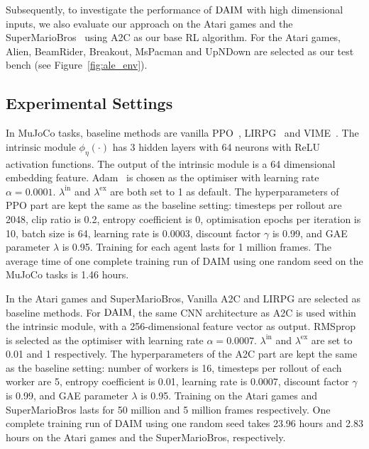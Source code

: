 Subsequently, to investigate the performance of $\text{DAIM}$ with high dimensional inputs, we also evaluate our approach on the Atari games and the SuperMarioBros~\cite{gym-super-mario-bros} using A2C as our base RL algorithm. For the Atari games, Alien, BeamRider, Breakout, MsPacman and UpNDown are selected as our test bench (see Figure~\ref{fig:ale_env}). 

\subsection{Experimental Settings}
In MuJoCo tasks, baseline methods are vanilla PPO~\cite{schulman2017proximal}, LIRPG~\cite{zheng2018learning} and VIME~\cite{NIPS2016_abd81528}. The intrinsic module $\phi_{\eta}(\cdot)$ has 3 hidden layers with 64 neurons with ReLU activation functions. The output of the intrinsic module is a 64 dimensional embedding feature. Adam~\cite{kingma2014adam} is chosen as the optimiser with learning rate $\alpha=0.0001$. $\lambda^{\text{in}}$ and $\lambda^{\text{ex}}$ are both set to 1 as default. The hyperparameters of PPO part are kept the same as the baseline setting: timesteps per rollout are 2048, clip ratio is 0.2, entropy coefficient is 0, optimisation epochs per iteration is 10, batch size is 64, learning rate is 0.0003, discount factor $\gamma$ is 0.99, and GAE parameter $\lambda$ is 0.95. Training for each agent lasts for 1 million frames. {The average time of one complete training run of DAIM using one random seed on the MuJoCo tasks is 1.46 hours.}

In the Atari games and SuperMarioBros, Vanilla A2C and LIRPG are selected as baseline methods. For $\text{DAIM}$, the same CNN architecture as A2C is used within the intrinsic module, with a 256-dimensional feature vector as output. RMSprop is selected as the optimiser with learning rate $\alpha=0.0007$. $\lambda^{\text{in}}$ and $\lambda^{\text{ex}}$ are set to 0.01 and 1 respectively. The hyperparameters of the A2C part are kept the same as the baseline setting: number of workers is 16, timesteps per rollout of each worker are 5, entropy coefficient is 0.01, learning rate is 0.0007, discount factor $\gamma$ is 0.99, and GAE parameter $\lambda$ is 0.95. Training on the Atari games and SuperMarioBros lasts for 50 million and 5 million frames respectively. One complete training run of DAIM using one random seed takes 23.96 hours and 2.83 hours on the Atari games and the SuperMarioBros, respectively.

